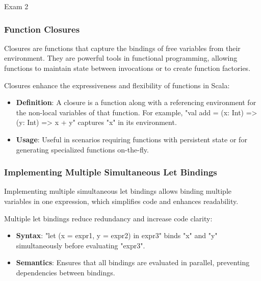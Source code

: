 \begin{examnotes}{Exam 2}
    \subsubsection*{Function Closures}
    
    Closures are functions that capture the bindings of free variables from their environment. They are powerful tools in functional programming, allowing functions to maintain state between 
    invocations or to create function factories.
    
    \begin{highlight}
        Closures enhance the expressiveness and flexibility of functions in Scala:
        \begin{itemize}
            \item \textbf{Definition}: A closure is a function along with a referencing environment for the non-local variables of that function. For example, "val add = (x: Int) => (y: Int) => x + y" 
            captures "x" in its environment.
            \item \textbf{Usage}: Useful in scenarios requiring functions with persistent state or for generating specialized functions on-the-fly.
        \end{itemize}
    \end{highlight}
    
    \subsubsection*{Implementing Multiple Simultaneous Let Bindings}
    
    Implementing multiple simultaneous let bindings allows binding multiple variables in one expression, which simplifies code and enhances readability.
    
    \begin{highlight}
        Multiple let bindings reduce redundancy and increase code clarity:
        \begin{itemize}
            \item \textbf{Syntax}: "let (x = expr1, y = expr2) in expr3" binds "x" and "y" simultaneously before evaluating "expr3".
            \item \textbf{Semantics}: Ensures that all bindings are evaluated in parallel, preventing dependencies between bindings.
        \end{itemize}
    \end{highlight}
    

\end{examnotes}
